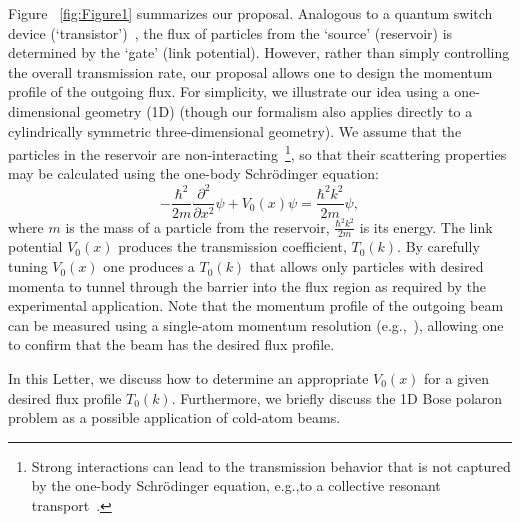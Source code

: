 \documentclass[twocolumn,amsmath,amssymb,showpacs,prl,superscriptaddress,aps]{revtex4-1}
\begin{document}
Figure ~\ref{fig:Figure1} summarizes our proposal. Analogous to a quantum switch device (`transistor')~\cite{zoller2004, marchukov2016}, the flux of particles from the `source' (reservoir) is determined by the `gate' (link potential). However, rather than simply controlling the overall transmission rate, our proposal allows one to design the momentum profile of the outgoing flux. For simplicity, we illustrate our idea using a one-dimensional geometry (1D) (though our formalism also applies directly to a cylindrically symmetric three-dimensional geometry). We assume that the particles in the reservoir are non-interacting~\footnote{Strong interactions can lead to the transmission behavior that is not captured by the one-body Schr{\"o}dinger equation, e.g.,to a collective resonant transport~\cite{Schlagheck2005}.}, so that their scattering properties may be calculated using the one-body Schr{\"o}dinger equation:
\begin{equation}
-\frac{\hbar^2}{2m}\frac{\partial^2}{\partial x^2}\psi+V_0(x)\psi=\frac{\hbar^2k^2}{2m}\psi,
\label{eq:schr}
\end{equation}
where $m$ is the mass of a particle from the reservoir, $\frac{\hbar^2k^2}{2m}$ is its energy. The link potential $V_0(x)$ produces the transmission coefficient, $T_0(k)$. By carefully tuning $V_0(x)$ one produces a $T_0(k)$ that allows only particles with desired momenta to tunnel through the barrier into the flux region as required by the experimental application. Note that the momentum profile of the outgoing beam can be measured using a single-atom momentum resolution (e.g.,~\cite{jochim2018}), allowing one to confirm that the beam has the desired flux profile.

In this Letter,  we discuss how to determine an appropriate $V_0(x)$ for a given desired flux profile $T_0(k)$. Furthermore, we briefly discuss the 1D Bose polaron problem as a possible application of cold-atom beams. 
\end{document}
